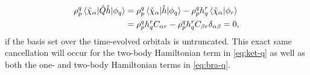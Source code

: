         \begin{align}
            \rho^{q}_{p}\mel*{\tilde{\chi}_{\alpha}}{
                \hat{Q}\hat{h}
            }{\phi_q}
            &=
            \rho^{q}_{p}\mel*{\tilde{\chi}_{\alpha}}{
                \hat{h}
            }{\phi_q}
            - \rho^{q}_{p}h^{r}_{q}
            \braket*{\tilde{\chi}_{\alpha}}{\phi_r}
            \\
            &=
            \rho^{q}_{p}h^{r}_{q}
            C_{\alpha r}
            - \rho^{q}_{p} h^{r}_{q}
            C_{\beta r} \delta_{\alpha \beta}
            = 0,
        \end{align}
        if the basis set over the time-evolved orbitals is untruncated.
        This exact same cancellation will occur for the two-body Hamiltonian
        term in \autoref{eq:ket-q} as well as both the one- and two-body
        Hamiltonian terms in \autoref{eq:bra-q}.

\clearemptydoublepage


